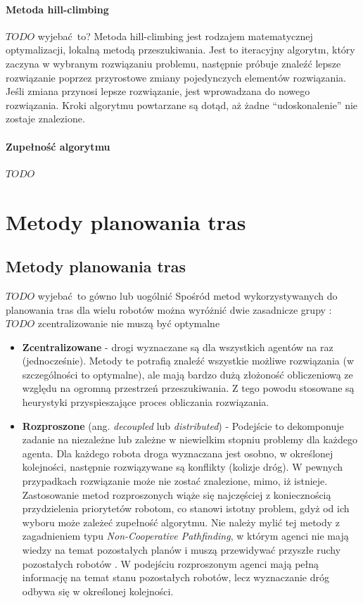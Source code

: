 \subsubsection{Metoda hill-climbing}
$TODO$ wyjebać to?
Metoda hill-climbing jest rodzajem matematycznej optymalizacji, lokalną metodą przeszukiwania.
Jest to iteracyjny algorytm, który zaczyna w wybranym rozwiązaniu problemu, następnie próbuje znaleźć lepsze rozwiązanie poprzez przyrostowe zmiany pojedynczych elementów rozwiązania.
Jeśli zmiana przynosi lepsze rozwiązanie, jest wprowadzana do nowego rozwiązania.
Kroki algorytmu powtarzane są dotąd, aż żadne ``udoskonalenie'' nie zostaje znalezione.

\subsubsection{Zupełność algorytmu}
$TODO$

\chapter{Metody planowania tras}
\label{ch:path_planning_methods}

\section{Metody planowania tras}
$TODO$ wyjebać to gówno lub uogólnić
Spośród metod wykorzystywanych do planowania tras dla wielu robotów można wyróżnić dwie zasadnicze grupy \cite{latombe}:
$TODO$ zcentralizowanie nie muszą być optymalne
\begin{itemize}
	\item {\bf Zcentralizowane} - drogi wyznaczane są dla wszystkich agentów na raz (jednocześnie). Metody te potrafią znaleźć wszystkie możliwe rozwiązania (w szczególności to optymalne), ale mają bardzo dużą złożoność obliczeniową ze względu na ogromną przestrzeń przeszukiwania. Z tego powodu stosowane są heurystyki przyspieszające proces obliczania rozwiązania.
	\item {\bf Rozproszone} (ang. {\it decoupled} lub {\it distributed}) - Podejście to dekomponuje zadanie na niezależne lub zależne w niewielkim stopniu problemy dla każdego agenta. Dla każdego robota droga wyznaczana jest osobno, w określonej kolejności, następnie rozwiązywane są konflikty (kolizje dróg). W pewnych przypadkach rozwiązanie może nie zostać znalezione, mimo, iż istnieje. Zastosowanie metod rozproszonych wiąże się najczęściej z koniecznością przydzielenia priorytetów robotom, co stanowi istotny problem, gdyż od ich wyboru może zależeć zupełność algorytmu. Nie należy mylić tej metody z zagadnieniem typu {\it Non-Cooperative Pathfinding}, w którym agenci nie mają wiedzy na temat pozostałych planów i muszą przewidywać przyszłe ruchy pozostałych robotów \cite{cooppath}. W podejściu rozproszonym agenci mają pełną informację na temat stanu pozostałych robotów, lecz wyznaczanie dróg odbywa się w określonej kolejności.
\end{itemize}

